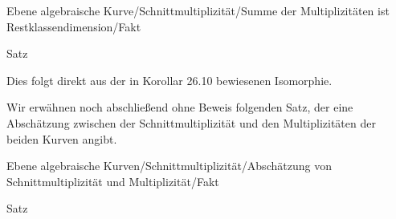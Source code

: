 
{Ebene algebraische Kurve/Schnittmultiplizität/Summe der Multiplizitäten ist Restklassendimension/Fakt}

{Satz}

{}

{


\faktsituation {}



\faktzusatz {}

\faktzusatz {}


}

{


Dies folgt direkt aus der in
Korollar 26.10
bewiesenen Isomorphie.


}


Wir erwähnen noch abschließend ohne Beweis folgenden Satz, der eine Abschätzung zwischen der Schnittmultiplizität und den Multiplizitäten der beiden Kurven angibt.



{Ebene algebraische Kurven/Schnittmultiplizität/Abschätzung von Schnittmultiplizität und Multiplizität/Fakt}

{Satz}

{}

